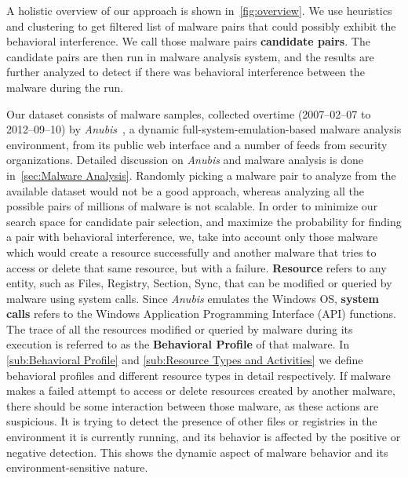 A holistic overview of our approach is shown in~\autoref{fig:overview}.
We use heuristics and clustering to get filtered list of malware pairs that could possibly exhibit the behavioral interference.
We call those malware pairs \textbf{candidate pairs}.
The candidate pairs are then run in malware analysis system, and the results are further analyzed to detect if there was behavioral interference between the malware during the run.

Our dataset consists of {\gettotalmalwarei{}} malware samples, collected overtime (2007--02--07 to 2012--09--10) by \emph{Anubis}~\cite[]{anubis}, a dynamic full-system-emulation-based malware analysis environment, from its public web interface and a number of feeds from security organizations.
Detailed discussion on \emph{Anubis} and malware analysis is done in~\autoref{sec:Malware Analysis}.
Randomly picking a malware pair to analyze from the available dataset would not be a good approach, whereas analyzing all the possible pairs of millions of malware is not scalable.
In order to minimize our search space for candidate pair selection, and maximize the probability for finding a pair with behavioral interference, we, take into account only those malware which would create a resource successfully and another malware that tries to access or delete that same resource, but with a failure.
\textbf{Resource} refers to any entity, such as Files, Registry, Section, Sync, that can be modified or queried by malware using system calls.
Since \emph{Anubis} emulates the Windows OS, \textbf{system calls} refers to the Windows Application Programming Interface (API) functions.
The trace of all the resources modified or queried by malware during its execution is referred to as the \textbf{Behavioral Profile} of that malware.
In \autoref{sub:Behavioral Profile} and \autoref{sub:Resource Types and Activities} we define behavioral profiles and different resource types in detail respectively.
If malware makes a failed attempt to access or delete resources created by another malware, there should be some interaction between those malware, as these actions are suspicious.
It is trying to detect the presence of other files or registries in the environment it is currently running, and its behavior is affected by the positive or negative detection.
This shows the dynamic aspect of malware behavior and its environment-sensitive nature.\\

